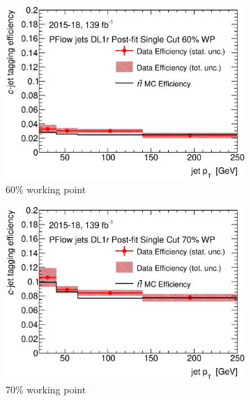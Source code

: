 \begin{figure}[H]
	\centering
	\begin{subfigure}[t]{.35\linewidth}
		\includegraphics[width=1\textwidth]{FTAG_plots/DL1rallPFlowDec/eff60.eps}
		\caption{60\% working point}
			\end{subfigure}
		\begin{subfigure}[t]{.35\linewidth}
			\includegraphics[width=1\textwidth]{FTAG_plots/DL1rallPFlowDec/eff70.eps}
			\caption{70\% working point}
		\end{subfigure}
		\begin{subfigure}[t]{.35\linewidth}

\end{subfigure}
\end{figure}
